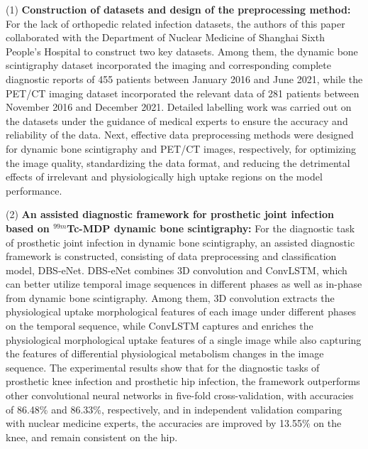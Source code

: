 \begin{eabstract}
    (1) \textbf{Construction of datasets and design of the preprocessing method: }For the lack of orthopedic related infection datasets, the authors of this paper collaborated with the Department of Nuclear Medicine of Shanghai Sixth People's Hospital to construct two key datasets. Among them, the dynamic bone scintigraphy dataset incorporated the imaging and corresponding complete diagnostic reports of 455 patients between January 2016 and June 2021, while the PET/CT imaging dataset incorporated the relevant data of 281 patients between November 2016 and December 2021. Detailed labelling work was carried out on the datasets under the guidance of medical experts to ensure the accuracy and reliability of the data. Next, effective data preprocessing methods were designed for dynamic bone scintigraphy and PET/CT images, respectively, for optimizing the image quality, standardizing the data format, and reducing the detrimental effects of irrelevant and physiologically high uptake regions on the model performance.

    (2) \textbf{An assisted diagnostic framework for prosthetic joint infection based on \(^{99m}\)Tc-MDP dynamic bone scintigraphy: }For the diagnostic task of prosthetic joint infection in dynamic bone scintigraphy, an assisted diagnostic framework is constructed, consisting of data preprocessing and classification model, DBS-eNet. DBS-eNet combines 3D convolution and ConvLSTM, which can better utilize temporal image sequences in different phases as well as in-phase from dynamic bone scintigraphy. Among them, 3D convolution extracts the physiological uptake morphological features of each image under different phases on the temporal sequence, while ConvLSTM captures and enriches the physiological morphological uptake features of a single image while also capturing the features of differential physiological metabolism changes in the image sequence. The experimental results show that for the diagnostic tasks of prosthetic knee infection and prosthetic hip infection, the framework outperforms other convolutional neural networks in five-fold cross-validation, with accuracies of 86.48\% and 86.33\%, respectively, and in independent validation comparing with nuclear medicine experts, the accuracies are improved by 13.55\% on the knee, and remain consistent on the hip.


\end{eabstract}
